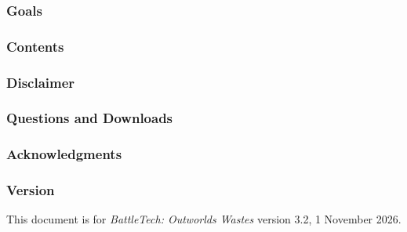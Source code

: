 

\subsubsection*{Goals}



\subsubsection*{Contents}



\subsubsection*{Disclaimer}



\subsubsection*{Questions and Downloads}



\subsubsection*{Acknowledgments}



\subsubsection*{Version}

This document is for \emph{BattleTech: Outworlds Wastes} version 3.2, 1 November 2026.

\newpage

\vspace*{\fill}

\vspace*{\fill}
